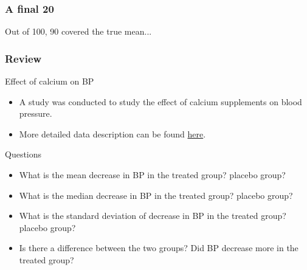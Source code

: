 \documentclass[handout]{beamer}
\newcommand{\mycolor}[1]{{\color{blue} #1}}
\begin{document}
   \begin{frame}
   \frametitle{A final 20}
   \begin{center}
   \end{center}
   Out of 100, 90 covered the true mean...
   \end{frame}


   \begin{frame} \frametitle{Review}

   \begin{block}
   {Effect of calcium on BP}
   \begin{itemize}
   \item A study was conducted to study the effect of calcium supplements
   on blood pressure.
   \item More detailed data description can be found
   \href{http://lib.stat.cmu.edu/DASL/Datafiles/Calcium.html}{\mycolor{here}}.
   \end{itemize}
   \end{block}

   \begin{block}
   {Questions}
   \begin{itemize}
   \item What is the mean decrease in BP in the treated group? placebo group?
   \item What is the median decrease in BP in the treated group? placebo group?
   \item What is the standard deviation of decrease in BP in the treated group? placebo group?
   \item Is there a difference between the two groups? Did BP decrease more in the treated group?
   \end{itemize}
   \end{block}
   \end{frame}

\end{document}
